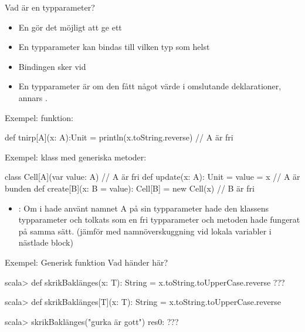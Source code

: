 \begin{Slide}{Vad är en typparameter?}\SlideFontSmall
  \setlength{\leftmargini}{0pt}

\begin{itemize}
\item En  gör det möjligt att ge ett 
\item En  typparameter kan bindas till vilken typ som helst
\item Bindingen sker vid 
\item En typparameter är  om den  fått något värde i omslutande deklarationer, annars .
\end{itemize}
Exempel:  funktion:
\begin{Code}
def tnirp[A](x: A):Unit = println(x.toString.reverse) // A är fri
\end{Code}
\pause
Exempel:  klass med generiska metoder:
\begin{Code}
class Cell[A](var value: A){                          // A är fri
  def update(x: A): Unit = value = x                  // A är bunden
  def create[B](x: B = value): Cell[B] = new Cell(x)  // B är fri
}
\end{Code}
\pause
\begin{itemize}
\item {}: Om  i  hade använt namnet A på sin typparameter hade den  klassens typparameter och tolkats som en  fri typparameter och metoden hade fungerat på samma sätt. (jämför med namnöverskuggning vid lokala variabler i nästlade block)
\end{itemize}

\end{Slide}

\ifkompendium\else
\begin{Slide}{Exempel: Generisk funktion}
Vad händer här?
\begin{REPL}

scala> def skrikBaklänges(x: T): String = x.toString.toUpperCase.reverse
???



scala> def skrikBaklänges[T](x: T): String = x.toString.toUpperCase.reverse

scala> skrikBaklänges("gurka är gott")
res0: ???

\end{REPL}
\end{Slide}


